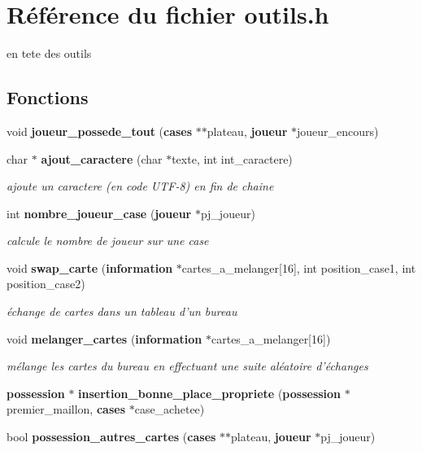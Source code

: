 \section{R\'{e}f\'{e}rence du fichier outils.h}
\label{outils_8h}
en tete des outils 

\subsection*{Fonctions}
\begin{CompactItemize}
\item 
void {\bf joueur\_\-possede\_\-tout} ({\bf cases} $\ast$$\ast$plateau, {\bf joueur} $\ast$joueur\_\-encours)
\item 
char $\ast$ {\bf ajout\_\-caractere} (char $\ast$texte, int int\_\-caractere)
\begin{CompactList}\small\item\em ajoute un caractere (en code UTF-8) en fin de chaine \item\end{CompactList}\item 
int {\bf nombre\_\-joueur\_\-case} ({\bf joueur} $\ast$pj\_\-joueur)
\begin{CompactList}\small\item\em calcule le nombre de joueur sur une case \item\end{CompactList}\item 
void {\bf swap\_\-carte} ({\bf information} $\ast$cartes\_\-a\_\-melanger[16], int position\_\-case1, int position\_\-case2)
\begin{CompactList}\small\item\em \'{e}change de cartes dans un tableau d'un bureau \item\end{CompactList}\item 
void {\bf melanger\_\-cartes} ({\bf information} $\ast$cartes\_\-a\_\-melanger[16])
\begin{CompactList}\small\item\em m\'{e}lange les cartes du bureau en effectuant une suite al\'{e}atoire d'\'{e}changes \item\end{CompactList}\item 
{\bf possession} $\ast$ {\bf insertion\_\-bonne\_\-place\_\-propriete} ({\bf possession} $\ast$premier\_\-maillon, {\bf cases} $\ast$case\_\-achetee)
\item 
bool {\bf possession\_\-autres\_\-cartes} ({\bf cases} $\ast$$\ast$plateau, {\bf joueur} $\ast$pj\_\-joueur)

\end{CompactItemize}
